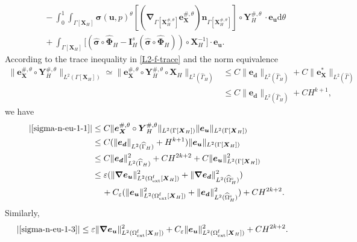 \documentclass[11pt,reqno]{amsart}
\theoremstyle{definition}
\theoremstyle{plain}
\numberwithin{theorem}{section}
\numberwithin{proposition}{section}
\numberwithin{lemma}{section}
\numberwithin{equation}{section}
\newcommand{\bs}[1]{\boldsymbol{#1}}
\newcommand{\uu}[1]  {{\bs{#1}} }
\newcommand{\grad}   { \uu{\nabla}    }
\def\d{\mathrm{d}}
\newcommand{\bu}{\uu{u}}
\renewcommand{\(}{\bigl(}
\renewcommand{\)}{\bigr)}
\begin{document}
\begin{itemize}[leftmargin=20pt]
\begin{subequations}
\begin{align}
&\quad\, - \int_0^1 \int_{\Gamma[\bs X_H]} {\bs\sigma}(\bu,p)^\theta [(\grad_{\Gamma[{\bs X}_H^{\#,\theta}]} {\bs e}_{\bs X}^{\#,\theta}) {\bs n}_{\Gamma[{\bs X}_H^{\#,\theta}]}]\circ {\bs Y}_H^{\#,\theta} \, \cdot {\bs e}_{\bs u} \d\theta 
\label{sigma-n-eu-1-2} \\ 
&\quad\,+ \int_{\Gamma[\bs X_H]} \big[ ({\widehat{\bs \sigma} } \circ \widehat{\bs\Phi}_H  - {\bs I}_H^s({\widehat{\bs\sigma}}\circ \widehat{\bs\Phi}_H) )\circ {\bs X}_H^{-1} \big] \cdot {\bs e}_{\bs u} .
\label{sigma-n-eu-1-3}
\end{align}
\end{subequations}
According to the trace inequality in \eqref{L2-f-trace} and the norm equivalence 
\begin{align*}
\| {\bs e}_{\bs X}^{\#,\theta} \circ {\bs Y}_H^{\#,\theta} \|_{L^2(\Gamma[\bs X_H])} \simeq \| {\bs e}_{\bs X}^{\#,\theta} \circ {\bs Y}_H^{\#,\theta} \circ {\bs X}_H \|_{L^2(\widehat\Gamma_H)} 
&\le C\| {\bs e}_{\bs d} \|_{L^2(\widehat\Gamma_H)} +  C\| {\bs e}_{\bs X}^* \|_{L^2(\widehat\Gamma)} \\
&\le C\| {\bs e}_{\bs d} \|_{L^2(\widehat\Gamma_H)} + CH^{k+1} ,
\end{align*}
we have 
\begin{align}\label{sigma-n-eu-1-1-est}
|\eqref{sigma-n-eu-1-1}|
&\le C\| {\bs e}_{\bs X}^{\#,\theta} \circ {\bs Y}_H^{\#,\theta} \|_{L^2(\Gamma[\bs X_H])} \| {\bs e}_{\bs u} \|_{L^2(\Gamma[\bs X_H])} \notag\\
&\le C(\| {\bs e}_{\bs d} \|_{L^2(\widehat\Gamma_H)} + H^{k+1} ) \| {\bs e}_{\bs u} \|_{L^2(\Gamma[\bs X_H])} \notag\\
&\le C\| {\bs e}_{\bs d} \|_{L^2(\widehat\Gamma_H)}^2  + CH^{2k+2}+ C\| {\bs e}_{\bs u} \|_{L^2(\Gamma[\bs X_H])}^2 \notag\\
&\le \varepsilon (\|\grad {\bs e}_{\bs u}\|_{L^2(\Omega^{\rm f}_{\rm ext}[\bs X_H])}^2 
+ \|\grad {\bs e}_{\bs d}\|_{L^2(\widehat{\Omega}^{\rm s}_H)}^2 ) \notag\\
&\quad\, + C_{\varepsilon}(\|{\bs e}_{\bs u}\|_{L^2(\Omega^{\rm f}_{\rm ext}[\bs X_H])}^2 + \| {\bs e}_{\bs d}\|_{L^2(\widehat{\Omega}^{\rm s}_H)}^2 ) + CH^{2k+2} . 
\end{align}
Similarly, 
\begin{align}\label{sigma-n-eu-1-3-est}
|\eqref{sigma-n-eu-1-3}|
&\le \varepsilon \|\grad {\bs e}_{\bs u}\|_{L^2(\Omega^{\rm f}_{\rm ext}[\bs X_H])}^2 
+ C_{\varepsilon} \|{\bs e}_{\bs u}\|_{L^2(\Omega^{\rm f}_{\rm ext}[\bs X_H])}^2 
+ CH^{2k+2} . 
\end{align}

\end{itemize}
\end{document}
